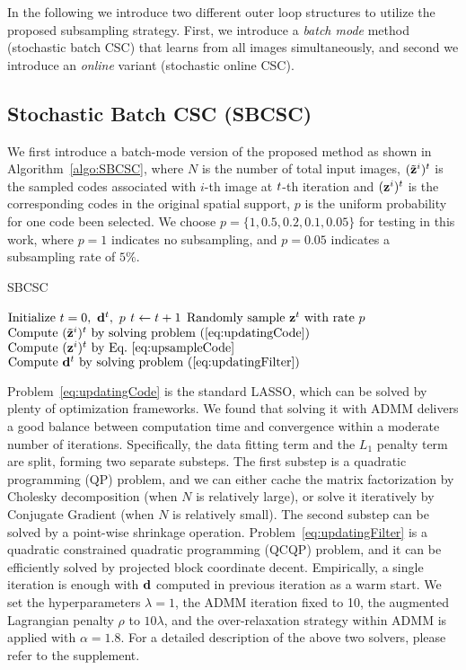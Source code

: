 In the following we introduce two different outer loop structures to
utilize the proposed subsampling strategy. First, we introduce a {\em
  batch mode} method (stochastic batch CSC) that learns from all
images simultaneously, and second we introduce an {\em online}
variant (stochastic online CSC).

\subsection{Stochastic Batch CSC (SBCSC)}
We first introduce a batch-mode version of the proposed method as
shown in Algorithm~\ref{algo:SBCSC}, where $N$ is the number of total
input images, $(\subcode^i)^{\ite}$ is the sampled codes associated with $i$-th
image at $t$-th iteration and $(\code^i)^{\ite}$ is the corresponding codes in the original spatial support, $p$ is the uniform probability for one code been
selected. We choose $p=\{1, 0.5, 0.2, 0.1, 0.05\}$ for testing in this
work, where $p=1$ indicates no subsampling, and $p=0.05$ indicates a
subsampling rate of $5\%$.

\begin{algorithm}[H]
\caption{SBCSC} \label{algo:SBCSC}
\begin{algorithmic}[1]
\State $\text{Initialize}  ~ \ite=0, ~\filter^t, ~p$
    \State $t \gets t+1$
    \State $ \text{Randomly sample }\code^{\ite} \text{ with rate } p $
        \State $ \text{Compute } (\subcode^i)^{\ite} \text{ by solving problem~(\ref{eq:updatingCode}})$
        \State $ \text{Compute } (\code^i)^{\ite}   \text{ by Eq.~\ref{eq:upsampleCode}}$
    \EndFor  
    \State $\text{Compute } \filter^{\ite} \text{ by solving problem~(\ref{eq:updatingFilter}})$
\EndWhile
\end{algorithmic}
\end{algorithm}

Problem~\eqref{eq:updatingCode} is the standard LASSO, which can be
solved by plenty of optimization frameworks. We found that solving it
with ADMM delivers a good balance between computation time and
convergence within a moderate number of iterations. Specifically, the
data fitting term and the $L_1$ penalty term are split, forming two
separate substeps. The first substep is a quadratic programming (QP)
problem, and we can either cache the matrix factorization by Cholesky
decomposition (when $N$ is relatively large), or solve it iteratively
by Conjugate Gradient (when $N$ is relatively small). The second
substep can be solved by a point-wise shrinkage operation.
Problem~\eqref{eq:updatingFilter} is a quadratic constrained
quadratic programming (QCQP) problem, and it can be efficiently solved
by projected block coordinate decent. Empirically, a single iteration
is enough with $\filter$ computed in previous iteration as a warm
start. We set the hyperparameters $\lambda=1$, the ADMM iteration
fixed to 10, the augmented Lagrangian penalty $\rho$ to $10 \lambda$,
and the over-relaxation strategy within ADMM is applied with $\alpha =
1.8$. For a detailed description of the above two solvers, please
refer to the supplement.

